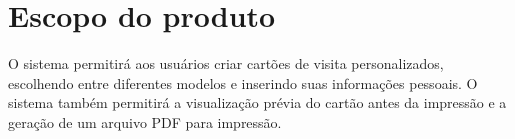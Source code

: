 \section{Escopo do produto}

O sistema permitirá aos usuários criar cartões de visita personalizados, escolhendo entre diferentes modelos e inserindo suas informações pessoais. O sistema também permitirá a visualização prévia do cartão antes da impressão e a geração de um arquivo PDF para impressão.

